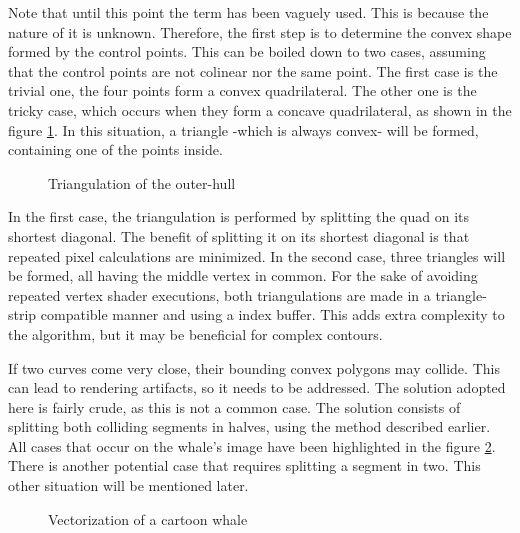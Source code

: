 \documentclass[\topdir/main.tex]{subfiles}
\begin{document}
Note that until this point the term  has been vaguely used. This is because the nature of it is unknown. Therefore, the first step is to determine the convex shape formed by the control points. This can be boiled down to two cases, assuming that the control points are not colinear nor the same point. The first case is the trivial one, the four points form a convex quadrilateral. The other one is the tricky case, which occurs when they form a concave quadrilateral, as shown in the figure \ref{fig:quad_triang}. In this situation, a triangle -which is always convex- will be formed, containing one of the points inside.\newline

\begin{figure}[hbtp]
    \centering

    \caption{Triangulation of the outer-hull}
    \label{fig:quad_triang}
\end{figure}

In the first case, the triangulation is performed by splitting the quad on its shortest diagonal. The benefit of splitting it on its shortest diagonal is that repeated pixel calculations are minimized. In the second case, three triangles will be formed, all having the middle vertex in common. For the sake of avoiding repeated vertex shader executions, both triangulations are made in a triangle-strip compatible manner and using a index buffer. This adds extra complexity to the algorithm, but it may be beneficial for complex contours.\newline

If two curves come very close, their bounding convex polygons may collide. This can lead to rendering artifacts, so it needs to be addressed. The solution adopted here is fairly crude, as this is not a common case. The solution consists of splitting both colliding segments in halves, using the method described earlier. All cases that occur on the whale's image have been highlighted in the figure \ref{fig:whale_intersections}. There is another potential case that requires splitting a segment in two. This other situation will be mentioned later.\newline

\begin{figure}[hbtp]
    \centering

    \caption{Vectorization of a cartoon whale}
    \label{fig:whale_intersections}
\end{figure}
\end{document}
